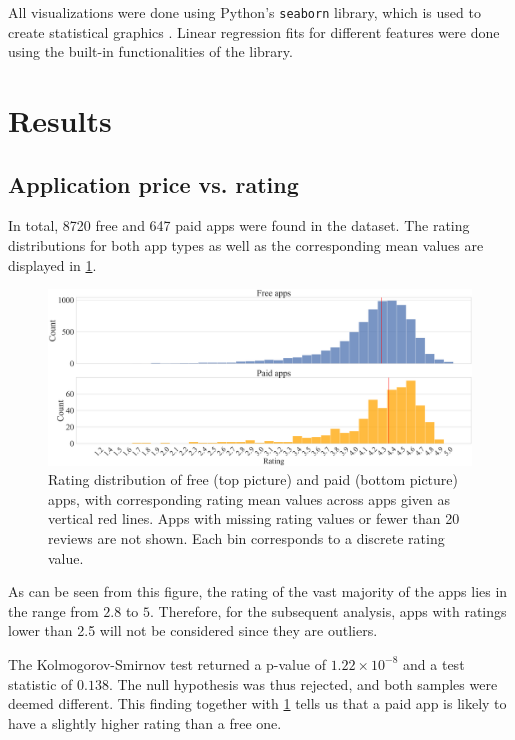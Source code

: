 \documentclass{article}
\begin{document}
All visualizations were done using Python's \verb+seaborn+ library, which is used to create statistical graphics \cite{seaborn}. Linear regression fits for different features were done using the built-in functionalities of the library.

\section{Results}

\subsection{Application price vs. rating}
\label{pricerating}

In total, 8720 free and 647 paid apps were found in the dataset.
The rating distributions for both app types as well as the corresponding mean values are displayed in \cref{fig1}.

\begin{figure}[h]
    \centering
    \includegraphics[scale=0.23]{figures/rating_distr.png}
    \caption{Rating distribution of free (top picture) and paid (bottom picture) apps, with corresponding rating mean values across apps given as vertical red lines. Apps with missing rating values or fewer than 20 reviews are not shown. Each bin corresponds to a discrete rating value.}
    \label{fig1}
\end{figure}

As can be seen from this figure, the rating of the vast majority of the apps lies in the range from $2.8$ to $5$. Therefore, for the subsequent analysis, apps with ratings lower than 2.5 will not be considered since they are outliers.

The Kolmogorov-Smirnov test returned a p-value of $1.22\times 10^{-8}$ and a test statistic of $0.138$. The null hypothesis was thus rejected, and both samples were deemed different. This finding together with \cref{fig1} tells us that a paid app is likely to have a slightly higher rating than a free one.
\end{document}
